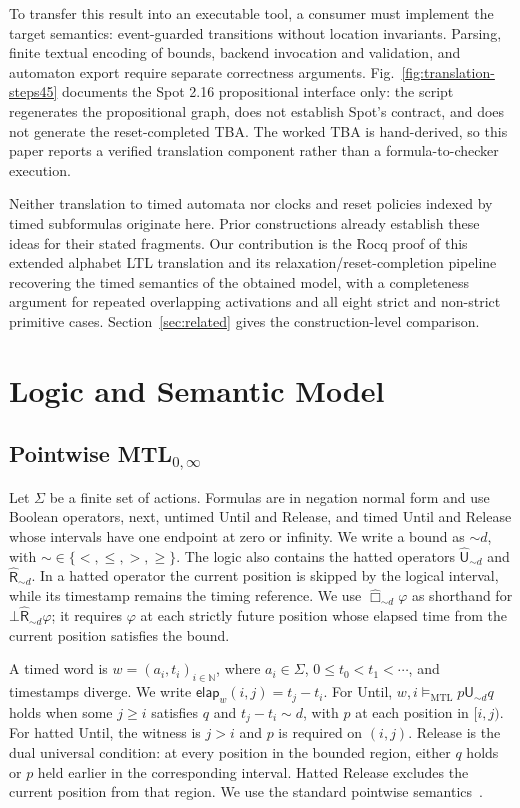 \documentclass[10pt,journal,compsoc]{IEEEtran}
\newcommand{\Nat}{\mathbb{N}}
\newcommand{\satM}{\models_{\mathrm{MTL}}}
\newcommand{\Until}{\mathbin{\mathsf{U}}}
\newcommand{\hUntil}{\mathbin{\widehat{\mathsf{U}}}}
\newcommand{\hRelease}{\mathbin{\widehat{\mathsf{R}}}}
\newcommand{\elapsed}{\mathsf{elap}}
\begin{document}
To transfer this result into an executable tool, a consumer must implement the
target semantics: event-guarded transitions without location invariants.
Parsing, finite textual encoding of bounds,
backend invocation and validation, and automaton export require separate
correctness arguments. Fig.~\ref{fig:translation-steps45} documents
the Spot 2.16 propositional interface only: the script regenerates the
propositional graph, does not establish Spot's contract, and does not generate
the reset-completed TBA. The worked TBA is hand-derived, so this paper reports
a verified translation component rather than a formula-to-checker execution.

Neither translation to timed automata nor clocks and reset policies indexed by
timed subformulas originate here. Prior constructions already establish these
ideas for their stated fragments. Our contribution is the Rocq proof of this
extended alphabet LTL translation and its relaxation/reset-completion pipeline recovering the timed semantics of the obtained model, with a
completeness argument for repeated overlapping activations and all eight
strict and non-strict primitive cases. Section~\ref{sec:related} gives the construction-level
comparison.

\section{Logic and Semantic Model}
\label{sec:logic}
\subsection{Pointwise MTL$_{0,\infty}$}
\label{sec:mtl}
Let $\Sigma$ be a finite set of actions. Formulas are in negation normal
form and use Boolean operators, next, untimed Until and Release, and timed
Until and Release whose intervals have one endpoint at zero or infinity.
We write a bound as $\sim d$, with $\sim\in\{<,\le,>,\ge\}$. The logic also
contains the hatted operators $\hUntil_{\sim d}$ and
$\hRelease_{\sim d}$. In a hatted operator the current position is skipped
by the logical interval, while its timestamp remains the timing reference.
We use $\widehat{\Box}_{\sim d}\varphi$ as shorthand for
$\bot\hRelease_{\sim d}\varphi$; it requires $\varphi$ at each strictly
future position whose elapsed time from the current position satisfies the
bound.

A timed word is $w=(a_i,t_i)_{i\in\Nat}$, where $a_i\in\Sigma$,
$0\le t_0<t_1<\cdots$, and timestamps diverge. We write
$\elapsed_w(i,j)=t_j-t_i$. For Until, $w,i\satM p\Until_{\sim d}q$
holds when some $j\ge i$ satisfies $q$ and $t_j-t_i\sim d$, with $p$ at
each position in $[i,j)$. For hatted Until, the witness is $j>i$ and $p$
is required on $(i,j)$. Release is the dual universal condition: at every
position in the bounded region, either $q$ holds or $p$ held earlier in the
corresponding interval. Hatted Release excludes the current position from
that region. We use the standard pointwise semantics~\cite{MTLsem}.
\end{document}
